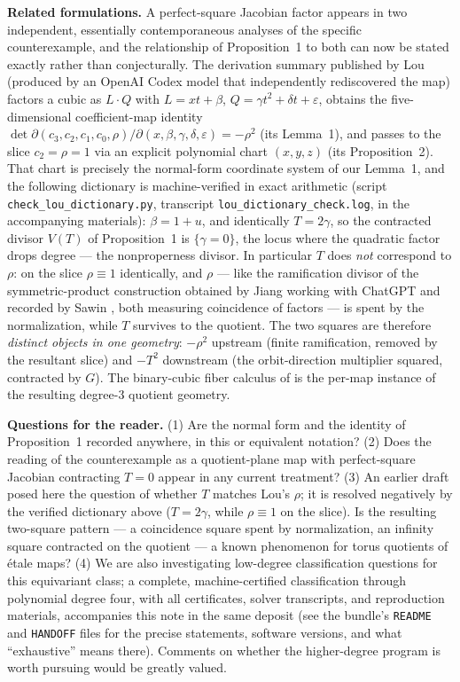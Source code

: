\documentclass[11pt]{article}
\begin{document}
\medskip
\noindent\textbf{Related formulations.} A perfect-square Jacobian factor
appears in two independent, essentially contemporaneous analyses of the
specific counterexample, and the relationship of Proposition~1 to both can
now be stated exactly rather than conjecturally. The derivation summary
published by Lou \cite{lou2026} (produced by an OpenAI Codex model that
independently rediscovered the map) factors a cubic as $L\cdot Q$ with
$L=xt+\beta$, $Q=\gamma t^{2}+\delta t+\varepsilon$, obtains the
five-dimensional coefficient-map identity
$\det\partial(c_3,c_2,c_1,c_0,\rho)/\partial(x,\beta,\gamma,\delta,\varepsilon)
=-\rho^{2}$ (its Lemma~1), and passes to the slice $c_2=\rho=1$ via an
explicit polynomial chart $(x,y,z)$ (its Proposition~2). That chart is
precisely the normal-form coordinate system of our Lemma~1, and the following
dictionary is machine-verified in exact arithmetic (script
\texttt{check\_lou\_dictionary.py}, transcript
\texttt{lou\_dictionary\_check.log}, in the accompanying materials):
$\beta=1+u$, and identically $T=2\gamma$, so the contracted divisor $V(T)$ of
Proposition~1 is $\{\gamma=0\}$, the locus where the quadratic factor drops
degree --- the nonproperness divisor. In particular $T$ does \emph{not}
correspond to $\rho$: on the slice $\rho\equiv1$ identically, and $\rho$ ---
like the ramification divisor of the symmetric-product construction obtained
by Jiang working with ChatGPT and recorded by Sawin \cite{sawin2026}, both
measuring coincidence of factors --- is spent by the normalization, while $T$
survives to the quotient. The two squares are therefore \emph{distinct
objects in one geometry}: $-\rho^{2}$ upstream (finite ramification, removed
by the resultant slice) and $-T^{2}$ downstream (the orbit-direction
multiplier squared, contracted by $G$). The binary-cubic fiber calculus of
\cite{ulam2026} is the per-map instance of the resulting degree-$3$ quotient
geometry.

\medskip
\noindent\textbf{Questions for the reader.}
(1) Are the normal form and the identity of Proposition~1 recorded anywhere, in
this or equivalent notation? (2) Does the reading of the counterexample as a
quotient-plane map with perfect-square Jacobian contracting $T=0$ appear in any
current treatment? (3) An earlier draft posed here the question of whether
$T$ matches Lou's $\rho$; it is resolved negatively by the verified
dictionary above ($T=2\gamma$, while $\rho\equiv1$ on the slice). Is the
resulting two-square pattern --- a coincidence square spent by normalization,
an infinity square contracted on the quotient --- a known phenomenon for
torus quotients of \'etale maps? (4) We are also investigating low-degree classification
questions for this equivariant class; a complete, machine-certified
classification through polynomial degree four, with all certificates, solver
transcripts, and reproduction materials, accompanies this note in the same
deposit (see the bundle's \texttt{README} and \texttt{HANDOFF} files for the
precise statements, software versions, and what ``exhaustive'' means there).
Comments on whether the higher-degree program is worth pursuing would be
greatly valued.
\end{document}
